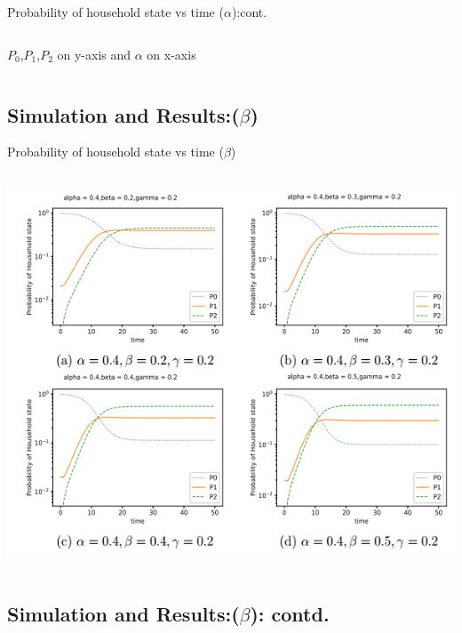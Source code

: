 \documentclass[smaller,aspectratio=169, toc=bibliography]{beamer}
\begin{document}
\begin{frame}{Probability of household state vs time ($\alpha$):cont.}
\begin{columns}[c]
\begin{center}
        \caption{$P_0$,$P_1$,$P_2$ on y-axis and $\alpha$ on x-axis}
        \end{center} 

\end{columns}
\end{frame}

\subsection*{Simulation and Results:($\beta$) }
\begin{frame}{Probability of household state vs time ($\beta$)}

\begin{columns}[c]
        \begin{center}
        \includegraphics[scale=0.3]{screenshot/8betaP_kvstime.png}
        \end{center}		
\end{columns}
\end{frame}

\subsection*{Simulation and Results:($\beta$): contd. }
\end{document}
